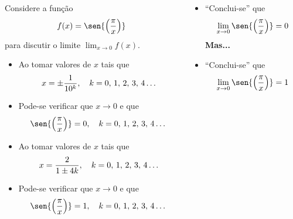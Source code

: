 \begin{frame}
  \begin{columns}[onlytextwidth]
    \begin{column}{0.49\textwidth}\vspace{-0.5cm}
      \begin{example}
        Considere a função
        \begin{equation*}
          f(x) = \sen{\left(\frac{\pi}{x}\right)}
        \end{equation*}
        para discutir o limite $\displaystyle\lim_{x\to 0}f(x)$.
      \end{example}
      \begin{itemize}
        \item<only@1> Ao tomar valores de $x$ tais que
        \begin{equation*}
          x = \pm\frac{1}{10^k}, \quad k=0,\,1,\,2,\,3,\,4 \dots\vspace{-0.1cm}
        \end{equation*}
        \item<only@1> Pode-se verificar que $x\to 0$ e que
        \begin{equation*}
          \sen{\left(\frac{\pi}{x}\right)} = 0, \quad k=0,\,1,\,2,\,3,\,4 \dots
        \end{equation*}
        \item<only@2> Ao tomar valores de $x$ tais que
        \begin{equation*}
          x = \frac{2}{1 \pm 4k}, \quad k=0,\,1,\,2,\,3,\,4 \dots\vspace{-0.1cm}
        \end{equation*}
        \item<only@2> Pode-se verificar que $x\to 0$ e que
        \begin{equation*}
          \sen{\left(\frac{\pi}{x}\right)} = 1, \quad k=0,\,1,\,2,\,3,\,4 \dots
        \end{equation*}
      \end{itemize}
    \end{column}
    \begin{column}{0.49\textwidth}\vspace{-0.85cm}
      \begin{figure}
      \end{figure}
      \begin{itemize}
        \item<only@1> ``Conclui-se'' que
        \begin{equation*}
          \lim_{x\to 0}{\sen{\left(\frac{\pi}{x}\right)}}=0
        \end{equation*}
        \textbf{Mas...}
        \item<only@2> ``Conclui-se'' que
        \begin{equation*}
          \lim_{x\to 0}{\sen{\left(\frac{\pi}{x}\right)}}=1
        \end{equation*}
      \end{itemize}
    \end{column}
  \end{columns}
\end{frame}

